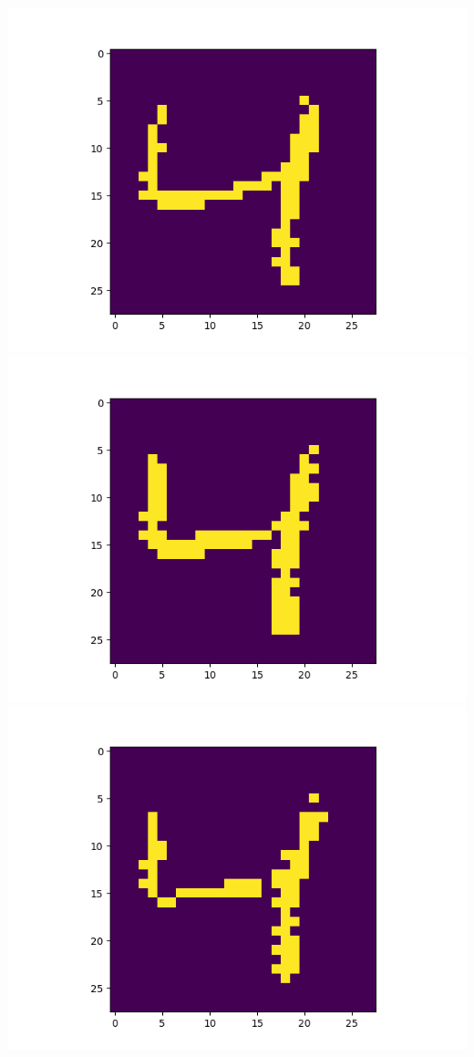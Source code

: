 \includegraphics[scale=0.2]{./bilder/comparison/prob/16}
\includegraphics[scale=0.2]{./bilder/comparison/prob/17}
\includegraphics[scale=0.2]{./bilder/comparison/prob/18}
